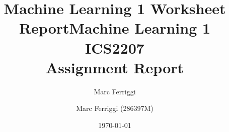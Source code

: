 \documentclass[11pt,a4paper,final]{article}
\author{Marc Ferriggi}
\title{Machine Learning 1 Worksheet Report}
\begin{document}
	\title{Machine Learning 1 \\
	\large ICS2207 \\ Assignment Report}
	\author{Marc Ferriggi (286397M)}
	\date{\today}
	\maketitle
	\tableofcontents
	\listoffigures
	\listoftables
	\lstlistoflistings
	
\end{document}
